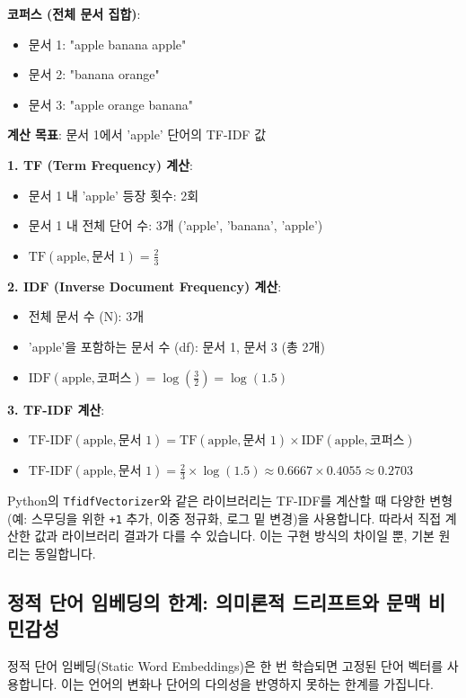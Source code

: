 \documentclass[11pt,a4paper]{article}
\theoremstyle{definition}
\begin{document}
\begin{examplebox}
\textbf{코퍼스 (전체 문서 집합)}:
\begin{itemize}
    \item 문서 1: "apple banana apple"
    \item 문서 2: "banana orange"
    \item 문서 3: "apple orange banana"
\end{itemize}
\textbf{계산 목표}: 문서 1에서 'apple' 단어의 TF-IDF 값

\textbf{1. TF (Term Frequency) 계산}:
\begin{itemize}
    \item 문서 1 내 'apple' 등장 횟수: 2회
    \item 문서 1 내 전체 단어 수: 3개 ('apple', 'banana', 'apple')
    \item $\text{TF}(\text{apple}, \text{문서 1}) = \frac{2}{3}$
\end{itemize}

\textbf{2. IDF (Inverse Document Frequency) 계산}:
\begin{itemize}
    \item 전체 문서 수 (N): 3개
    \item 'apple'을 포함하는 문서 수 (df): 문서 1, 문서 3 (총 2개)
    \item $\text{IDF}(\text{apple}, \text{코퍼스}) = \log\left(\frac{3}{2}\right) = \log(1.5)$
\end{itemize}

\textbf{3. TF-IDF 계산}:
\begin{itemize}
    \item $\text{TF-IDF}(\text{apple}, \text{문서 1}) = \text{TF}(\text{apple}, \text{문서 1}) \times \text{IDF}(\text{apple}, \text{코퍼스})$
    \item $\text{TF-IDF}(\text{apple}, \text{문서 1}) = \frac{2}{3} \times \log(1.5) \approx 0.6667 \times 0.4055 \approx 0.2703$
\end{itemize}
\end{examplebox}

\begin{warningbox}
Python의 \texttt{TfidfVectorizer}와 같은 라이브러리는 TF-IDF를 계산할 때 다양한 변형(예: 스무딩을 위한 \texttt{+1} 추가, 이중 정규화, 로그 밑 변경)을 사용합니다. 따라서 직접 계산한 값과 라이브러리 결과가 다를 수 있습니다. 이는 구현 방식의 차이일 뿐, 기본 원리는 동일합니다.
\end{warningbox}

\newpage
\subsection{정적 단어 임베딩의 한계: 의미론적 드리프트와 문맥 비민감성}
정적 단어 임베딩(Static Word Embeddings)은 한 번 학습되면 고정된 단어 벡터를 사용합니다. 이는 언어의 변화나 단어의 다의성을 반영하지 못하는 한계를 가집니다.
\end{document}
